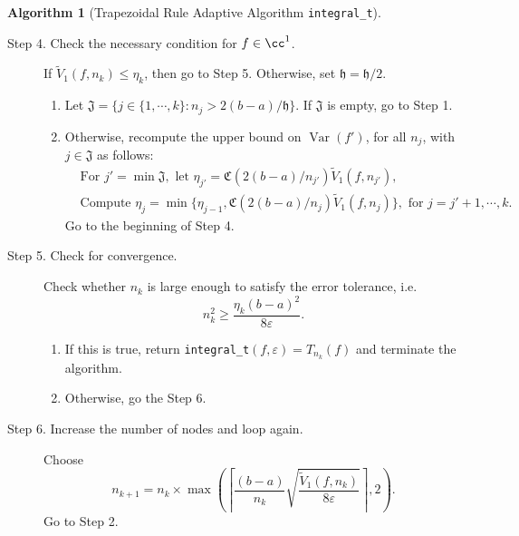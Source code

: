 \documentclass{iitthesis}
\DeclareMathOperator{\Var}{Var}
\theoremstyle{definition}
\newtheorem{algo}{Algorithm}
\theoremstyle{remark}
\begin{document}
\begin{algo}[Trapezoidal Rule Adaptive Algorithm {\tt integral\_t}]
\begin{description}
\item[Step 4. Check the necessary condition for $f \in \cc^1$.] If $\widetilde{V}_1(f,n_k) \le \eta_{k}$, then go to Step 5.
  Otherwise, set $\mathfrak{h} = \mathfrak{h}/2$.
    \begin{enumerate}[label=\alph*)]
      \item Let $\mathfrak{J}=\{j\in\{1, \cdots, k\}: n_{j}> 2(b-a)/\mathfrak{h}\}$. If $\mathfrak{J}$ is empty, go to Step 1.
      \item Otherwise, recompute the upper bound on $\Var(f')$, for all $n_{j}$, with $j \in \mathfrak{J}$ as follows:
      \begin{align*}
        &\text{For } j'=\min\mathfrak{J}, \text{ let } \eta_{j'}=\mathfrak{C}(2(b-a)/n_{j'})\widetilde{V}_1(f,n_{j'}), \\
        &\text{Compute } \eta_{j}=\min\{\eta_{j-1},\mathfrak{C}(2(b-a)/n_{j})\widetilde{V}_1(f,n_{j})\}, \text{ for } j=j'+1, \cdots, k.
      \end{align*}
        Go to the beginning of Step 4.
    \end{enumerate}


\item[Step 5. Check for convergence.] Check whether $n_k$ is large enough to satisfy the error tolerance, i.e.
    \begin{equation*}
         n_k^2 \ge \frac{\eta_{k}(b-a)^2}{8\varepsilon }.
    \end{equation*}

    \begin{enumerate}[label=\alph*)]
      \item If this is true, return {\tt integral\_t}$(f,\varepsilon)=T_{n_k}(f)$ and terminate the algorithm.
      \item Otherwise, go the Step 6.
    \end{enumerate}


\item[Step 6. Increase the number of nodes and loop again.] Choose
$$
n_{k+1}=n_k\times\max\left(\left\lceil\frac{(b-a)}{n_{k}}\sqrt{\frac{\widetilde{V}_1(f,n_k)}{8\varepsilon}}\right\rceil,2\right).
$$
Go to Step 2.
\end{description}
\end{algo}
\end{document}
